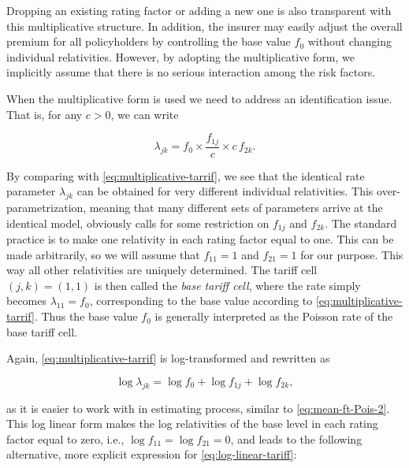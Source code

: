 \documentclass[]{book}
\theoremstyle{definition}
\theoremstyle{definition}
\theoremstyle{definition}
\theoremstyle{remark}
\begin{document}
Dropping an existing rating factor or adding a new one is also
transparent with this multiplicative structure. In addition, the insurer
may easily adjust the overall premium for all policyholders by
controlling the base value \(f_0\) without changing individual
relativities. However, by adopting the multiplicative form, we
implicitly assume that there is no serious interaction among the risk
factors.

When the multiplicative form is used we need to address an
identification issue. That is, for any \(c>0\), we can write

\begin{equation}
\lambda_{jk}= f_0 \times \frac{f_{1j}}{c} \times c\,f_{2k}. 
\end{equation}

By comparing with \eqref{eq:multiplicative-tarrif}, we see that the
identical rate parameter \(\lambda_{jk}\) can be obtained for very
different individual relativities. This over-parametrization, meaning
that many different sets of parameters arrive at the identical model,
obviously calls for some restriction on \(f_{1j}\) and \(f_{2k}\). The
standard practice is to make one relativity in each rating factor equal
to one. This can be made arbitrarily, so we will assume that
\(f_{11}=1\) and \(f_{21}=1\) for our purpose. This way all other
relativities are uniquely determined. The tariff cell \((j,k)=(1,1)\) is
then called the \emph{base tariff cell}, where the rate simply becomes
\(\lambda_{11}=f_0\), corresponding to the base value according to
\eqref{eq:multiplicative-tarrif}. Thus the base value \(f_0\) is generally
interpreted as the Poisson rate of the base tariff cell.

Again, \eqref{eq:multiplicative-tarrif} is log-transformed and rewritten
as

\begin{equation}
\log \lambda_{jk}= \log f_0 + \log f_{1j} + \log f_{2k},
\label{eq:log-linear-tariff}
\end{equation}

as it is easier to work with in estimating process, similar to
\eqref{eq:mean-ft-Pois-2}. This log linear form makes the log relativities
of the base level in each rating factor equal to zero, i.e.,
\(\log f_{11}=\log f_{21}=0\), and leads to the following alternative,
more explicit expression for \eqref{eq:log-linear-tariff}:
\end{document}
